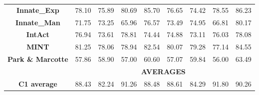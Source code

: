 \begin{table}[]
\begin{tabular}{|c|cccc|cccc|}
    \textbf{Innate\_Exp} & \cellcolor[rgb]{ .765,  .843,  .71} 78.10 & \cellcolor[rgb]{ .886,  .937,  .855} 75.89 & \cellcolor[rgb]{ .616,  .729,  .541} 80.69 & \cellcolor[rgb]{ .329,  .51,  .208} 85.70 & \cellcolor[rgb]{ .784,  .859,  .733} 76.65 & \cellcolor[rgb]{ .886,  .937,  .855} 74.42 & \cellcolor[rgb]{ .694,  .788,  .631} 78.55 & \cellcolor[rgb]{ .329,  .51,  .208} 86.23 \\
    \textbf{Innate\_Man} & \cellcolor[rgb]{ .584,  .706,  .502} 71.75 & \cellcolor[rgb]{ .506,  .647,  .412} 73.25 & \cellcolor[rgb]{ .886,  .937,  .855} 65.96 & \cellcolor[rgb]{ .329,  .51,  .208} 76.57 & \cellcolor[rgb]{ .612,  .725,  .533} 73.49 & \cellcolor[rgb]{ .549,  .678,  .463} 74.95 & \cellcolor[rgb]{ .886,  .937,  .855} 66.81 & \cellcolor[rgb]{ .329,  .51,  .208} 80.17 \\
    \textbf{IntAct} & \cellcolor[rgb]{ .533,  .667,  .443} 76.94 & \cellcolor[rgb]{ .886,  .937,  .855} 73.61 & \cellcolor[rgb]{ .329,  .51,  .208} 78.81 & \cellcolor[rgb]{ .8,  .871,  .753} 74.44 & \cellcolor[rgb]{ .69,  .788,  .627} 74.88 & \cellcolor[rgb]{ .886,  .937,  .855} 73.11 & \cellcolor[rgb]{ .561,  .686,  .475} 76.03 & \cellcolor[rgb]{ .329,  .51,  .208} 78.08 \\
    \textbf{MINT} & \cellcolor[rgb]{ .49,  .635,  .396} 81.25 & \cellcolor[rgb]{ .886,  .937,  .855} 78.06 & \cellcolor[rgb]{ .78,  .855,  .729} 78.94 & \cellcolor[rgb]{ .329,  .51,  .208} 82.54 & \cellcolor[rgb]{ .667,  .769,  .6} 80.07 & \cellcolor[rgb]{ .729,  .816,  .671} 79.28 & \cellcolor[rgb]{ .886,  .937,  .855} 77.14 & \cellcolor[rgb]{ .329,  .51,  .208} 84.55 \\
    \textbf{Park \& Marcotte} & \cellcolor[rgb]{ .757,  .835,  .702} 57.86 & \cellcolor[rgb]{ .596,  .714,  .514} 58.90 & \cellcolor[rgb]{ .886,  .937,  .855} 57.00 & \cellcolor[rgb]{ .329,  .51,  .208} 60.60 & \cellcolor[rgb]{ .808,  .878,  .765} 57.07 & \cellcolor[rgb]{ .604,  .722,  .525} 59.84 & \cellcolor[rgb]{ .886,  .937,  .855} 56.00 & \cellcolor[rgb]{ .329,  .51,  .208} 63.49 \\
    \midrule
          & \multicolumn{8}{c|}{\textbf{AVERAGES}} \\
    \midrule
    \textbf{C1 average} & \cellcolor[rgb]{ .506,  .647,  .412} 88.43 & \cellcolor[rgb]{ .886,  .937,  .855} 82.24 & \cellcolor[rgb]{ .329,  .51,  .208} 91.26 & \cellcolor[rgb]{ .502,  .643,  .408} 88.48 & \cellcolor[rgb]{ .569,  .694,  .486} 88.61 & \cellcolor[rgb]{ .886,  .937,  .855} 84.29 & \cellcolor[rgb]{ .329,  .51,  .208} 91.80 & \cellcolor[rgb]{ .447,  .6,  .341} 90.26 \\

\end{tabular}
\end{table}
